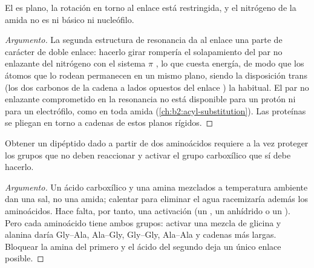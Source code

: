 \begin{proposition}\label{prop:b2:biomolecules:planar}
El  es plano, la rotación en torno al enlace  está restringida, y el nitrógeno de la amida no es
ni básico ni nucleófilo.
\end{proposition}

\begin{proof}[Argumento]
La segunda estructura de resonancia da al enlace  una parte de carácter de doble enlace: hacerlo girar
rompería el solapamiento del par no enlazante del nitrógeno con el sistema $\pi$ , lo que cuesta energía, de modo que
los átomos que lo rodean permanecen en un mismo plano, siendo la disposición trans (los dos carbonos de la cadena a lados opuestos
del enlace ) la habitual. El par no enlazante comprometido en la resonancia no está disponible para un protón ni para un
electrófilo, como en toda amida (\cref{ch:b2:acyl-substitution}). Las proteínas se pliegan en torno a cadenas de estos
planos rígidos.
\end{proof}

\begin{proposition}\label{prop:b2:biomolecules:coupling}
Obtener un dipéptido dado a partir de dos aminoácidos requiere a la vez proteger los grupos que no deben
reaccionar y activar el grupo carboxílico que sí debe hacerlo.
\end{proposition}

\begin{proof}[Argumento]
Un ácido carboxílico y una amina mezclados a temperatura ambiente dan una sal, no una amida; calentar para eliminar
el agua racemizaría además los aminoácidos. Hace falta, por tanto, una activación (un , un anhídrido o un
). Pero cada aminoácido tiene ambos grupos: activar una mezcla de glicina y
alanina daría Gly--Ala, Ala--Gly, Gly--Gly, Ala--Ala y cadenas más largas. Bloquear la amina del
primero y el ácido del segundo deja un único enlace posible.
\end{proof}

